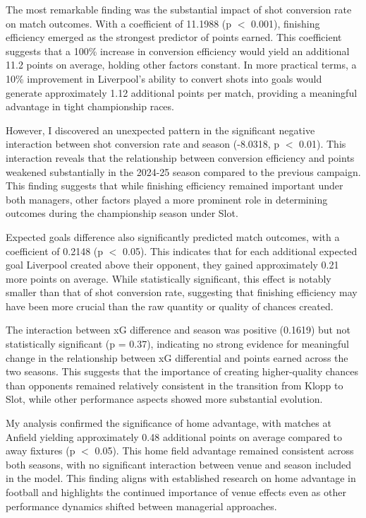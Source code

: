 \documentclass[12pt]{article}
\begin{document}
The most remarkable finding was the substantial impact of shot conversion rate on match outcomes. With a coefficient of 11.1988 (p $<$ 0.001), finishing efficiency emerged as the strongest predictor of points earned. This coefficient suggests that a 100\% increase in conversion efficiency would yield an additional 11.2 points on average, holding other factors constant. In more practical terms, a 10\% improvement in Liverpool's ability to convert shots into goals would generate approximately 1.12 additional points per match, providing a meaningful advantage in tight championship races.

However, I discovered an unexpected pattern in the significant negative interaction between shot conversion rate and season (-8.0318, p $<$ 0.01). This interaction reveals that the relationship between conversion efficiency and points weakened substantially in the 2024-25 season compared to the previous campaign. This finding suggests that while finishing efficiency remained important under both managers, other factors played a more prominent role in determining outcomes during the championship season under Slot.

Expected goals difference also significantly predicted match outcomes, with a coefficient of 0.2148 (p $<$ 0.05). This indicates that for each additional expected goal Liverpool created above their opponent, they gained approximately 0.21 more points on average. While statistically significant, this effect is notably smaller than that of shot conversion rate, suggesting that finishing efficiency may have been more crucial than the raw quantity or quality of chances created.

The interaction between xG difference and season was positive (0.1619) but not statistically significant (p = 0.37), indicating no strong evidence for meaningful change in the relationship between xG differential and points earned across the two seasons. This suggests that the importance of creating higher-quality chances than opponents remained relatively consistent in the transition from Klopp to Slot, while other performance aspects showed more substantial evolution.

My analysis confirmed the significance of home advantage, with matches at Anfield yielding approximately 0.48 additional points on average compared to away fixtures (p $<$ 0.05). This home field advantage remained consistent across both seasons, with no significant interaction between venue and season included in the model. This finding aligns with established research on home advantage in football \citep{kern2012} and highlights the continued importance of venue effects even as other performance dynamics shifted between managerial approaches.
\end{document}
